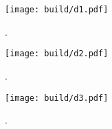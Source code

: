 \begin{figure}
  \centering
  \texttt{[image: build/d1.pdf]}
  \caption{.}
  \label{fig:d1}
\end{figure}

\begin{figure}
  \centering
  \texttt{[image: build/d2.pdf]}
  \caption{.}
  \label{fig:d2}
\end{figure}

\begin{figure}
  \centering
  \texttt{[image: build/d3.pdf]}
  \caption{.}
  \label{fig:d3}
\end{figure}
